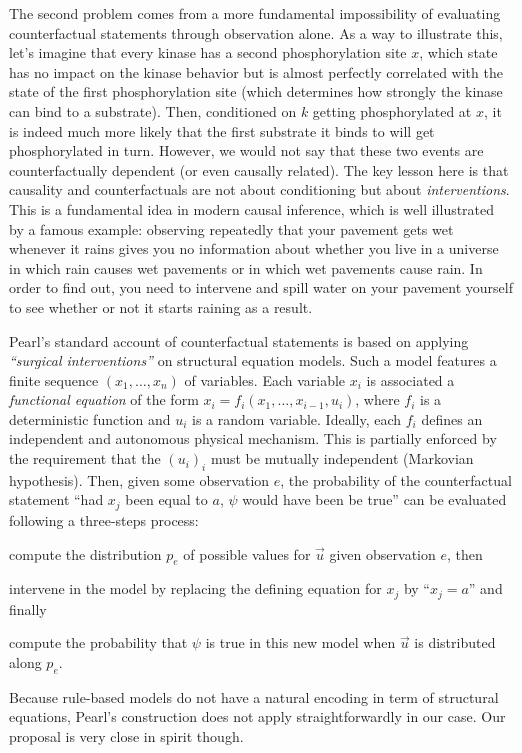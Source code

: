 The second problem comes from a more fundamental impossibility of
evaluating counterfactual statements through observation alone. As a
way to illustrate this, let's imagine that every kinase has a second
phosphorylation site $x$, which state has no impact on the kinase
behavior but is almost perfectly correlated with the state of the
first phosphorylation site (which determines how strongly the kinase
can bind to a substrate). Then, conditioned on $k$ getting
phosphorylated at $x$, it is indeed much more likely that the first
substrate it binds to will get phosphorylated in turn. However, we
would not say that these two events are counterfactually dependent (or
even causally related). The key lesson here is that causality and
counterfactuals are not about conditioning but about
\emph{interventions}. This is a fundamental idea in modern causal
inference, which is well illustrated by a famous example: observing
repeatedly that your pavement gets wet whenever it rains gives you no
information about whether you live in a universe in which rain causes
wet pavements or in which wet pavements cause rain. In order to find
out, you need to intervene and spill water on your pavement yourself
to see whether or not it starts raining as a result.

Pearl's standard account of counterfactual statements is based on
applying \textit{``surgical interventions''} on structural equation
models. Such a model features a finite sequence $(x_1, \dots, x_n)$ of
variables. Each variable $x_i$ is associated a \emph{functional
  equation} of the form $x_i = f_i(x_1, \dots, x_{i-1}, u_i)$, where
$f_i$ is a deterministic function and $u_i$ is a random
variable. Ideally, each $f_i$ defines an independent and autonomous
physical mechanism. This is partially enforced by the requirement that
the $(u_i)_i$ must be mutually independent (Markovian
hypothesis). Then, given some observation $e$, the probability of the
counterfactual statement ``had $x_j$ been equal to $a$, $\psi$ would
have been be true'' can be evaluated following a three-steps process:
\begin{inparaenum}[]
\item \ItAbduction{} compute the distribution $p_e$ of possible values for
  $\vec u$ given observation $e$, then
\item \ItAction{} intervene in the model by replacing the
  defining equation for $x_j$ by ``$x_j = a$'' and finally
\item \ItPrediction{} compute the probability that $\psi$ is true in this
  new model when $\vec{u}$ is distributed along $p_e$.
\end{inparaenum}
Because rule-based models do not have a natural encoding in term of
structural equations, Pearl's construction does not apply
straightforwardly in our case. Our proposal is very close in spirit though.



